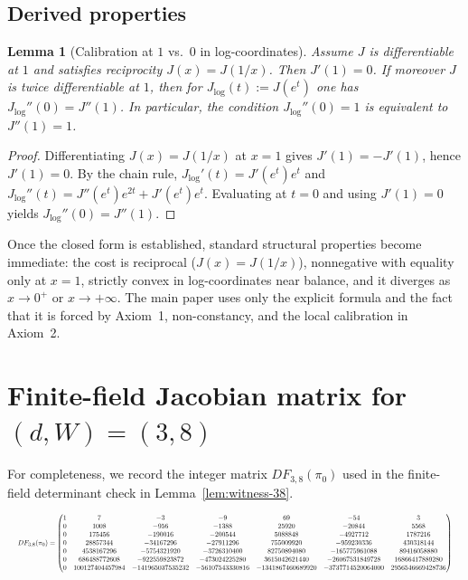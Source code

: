 \documentclass[11pt,reqno]{amsart}
\newtheorem{lemma}[theorem]{Lemma}
\theoremstyle{definition}
\theoremstyle{remark}
\newcommand{\1}{\mathbf{1}}
\begin{document}
\subsection{Derived properties}\label{app:RCL:derived}


\begin{lemma}[Calibration at $1$ vs.\ $0$ in log-coordinates]\label{lem:calibration-equivalence}
Assume $J$ is differentiable at $1$ and satisfies reciprocity $J(x)=J(1/x)$. Then $J'(1)=0$.
If moreover $J$ is twice differentiable at $1$, then for $J_{\log}(t):=J(e^t)$ one has
$J_{\log}''(0)=J''(1)$. In particular, the condition $J_{\log}''(0)=1$ is equivalent to $J''(1)=1$.
\end{lemma}

\begin{proof}
Differentiating $J(x)=J(1/x)$ at $x=1$ gives $J'(1)=-J'(1)$, hence $J'(1)=0$.
By the chain rule, $J_{\log}'(t)=J'(e^t)e^t$ and $J_{\log}''(t)=J''(e^t)e^{2t}+J'(e^t)e^t$.
Evaluating at $t=0$ and using $J'(1)=0$ yields $J_{\log}''(0)=J''(1)$.
\end{proof}



Once the closed form is established, standard structural properties become immediate: the cost is reciprocal ($J(x)=J(1/x)$), nonnegative with equality only at $x=1$, strictly convex in log-coordinates near balance, and it diverges as $x\to 0^{+}$ or $x\to+\infty$. The main paper uses only the explicit formula and the fact that it is forced by Axiom~1, non-constancy, and the local calibration in Axiom~2.


\section{\texorpdfstring{Finite-field Jacobian matrix for $(d,W)=(3,8)$}{Finite-field Jacobian matrix for (d,W)=(3,8)}}\label{app:jacobian-38}
For completeness, we record the integer matrix $DF_{3,8}(\pi_0)$ used in the finite-field determinant check in Lemma~\ref{lem:witness-38}.

\[
\resizebox{\textwidth}{!}{$
	DF_{3,8}(\pi_0)=
	\begin{pmatrix}
		1& 7& -3& -9& 69& -54& 3\\
		0& 1008& -956& -1388& 25920& -20844& 5568\\
		0& 175456& -190016& -200544& 5088848& -4927712& 1787216\\
		0& 28857344& -34167296& -27911296& 755009920& -959230336& 430318144\\
		0& 4538167296& -5754321920& -3726310400& 82750894080& -165775961088& 89416058880\\
		0& 686488772608& -922559823872& -473024225280& 3615042621440& -26067531849728& 16866417889280\\
		0& 100127404457984& -141965037535232& -56107543330816& -1341867460689920& -3737714520064000& 2956546669428736
	\end{pmatrix}
	$}
\]
\end{document}
